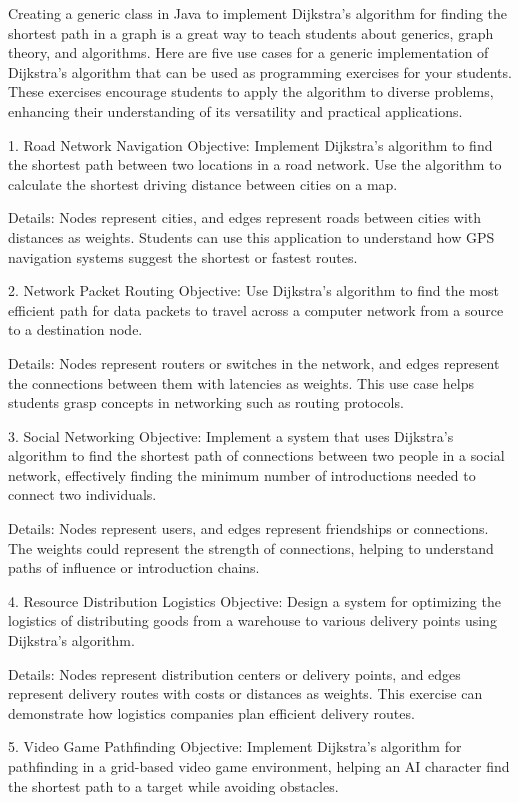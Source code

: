 Creating a generic class in Java to implement Dijkstra's algorithm for finding the shortest path in a graph is a great way to teach students about generics, graph theory, and algorithms. Here are five use cases for a generic implementation of Dijkstra's algorithm that can be used as programming exercises for your students. These exercises encourage students to apply the algorithm to diverse problems, enhancing their understanding of its versatility and practical applications.

1. Road Network Navigation
Objective: Implement Dijkstra's algorithm to find the shortest path between two locations in a road network. Use the algorithm to calculate the shortest driving distance between cities on a map.

Details: Nodes represent cities, and edges represent roads between cities with distances as weights. Students can use this application to understand how GPS navigation systems suggest the shortest or fastest routes.

2. Network Packet Routing
Objective: Use Dijkstra's algorithm to find the most efficient path for data packets to travel across a computer network from a source to a destination node.

Details: Nodes represent routers or switches in the network, and edges represent the connections between them with latencies as weights. This use case helps students grasp concepts in networking such as routing protocols.

3. Social Networking
Objective: Implement a system that uses Dijkstra's algorithm to find the shortest path of connections between two people in a social network, effectively finding the minimum number of introductions needed to connect two individuals.

Details: Nodes represent users, and edges represent friendships or connections. The weights could represent the strength of connections, helping to understand paths of influence or introduction chains.

4. Resource Distribution Logistics
Objective: Design a system for optimizing the logistics of distributing goods from a warehouse to various delivery points using Dijkstra's algorithm.

Details: Nodes represent distribution centers or delivery points, and edges represent delivery routes with costs or distances as weights. This exercise can demonstrate how logistics companies plan efficient delivery routes.

5. Video Game Pathfinding
Objective: Implement Dijkstra's algorithm for pathfinding in a grid-based video game environment, helping an AI character find the shortest path to a target while avoiding obstacles.

